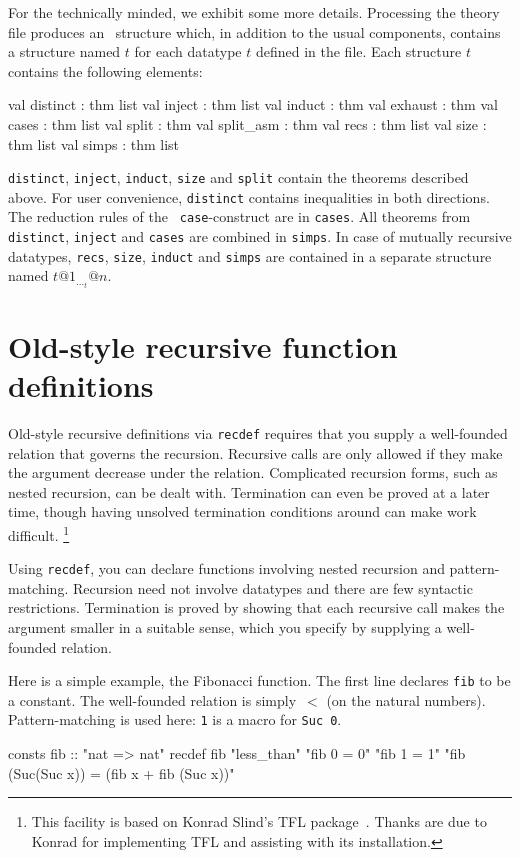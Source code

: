 For the technically minded, we exhibit some more details.  Processing the
theory file produces an \ML\ structure which, in addition to the usual
components, contains a structure named $t$ for each datatype $t$ defined in
the file.  Each structure $t$ contains the following elements:
\begin{ttbox}
val distinct : thm list
val inject : thm list
val induct : thm
val exhaust : thm
val cases : thm list
val split : thm
val split_asm : thm
val recs : thm list
val size : thm list
val simps : thm list
\end{ttbox}
\texttt{distinct}, \texttt{inject}, \texttt{induct}, \texttt{size}
and \texttt{split} contain the theorems
described above.  For user convenience, \texttt{distinct} contains
inequalities in both directions.  The reduction rules of the {\tt
  case}-construct are in \texttt{cases}.  All theorems from {\tt
  distinct}, \texttt{inject} and \texttt{cases} are combined in \texttt{simps}.
In case of mutually recursive datatypes, \texttt{recs}, \texttt{size}, \texttt{induct}
and \texttt{simps} are contained in a separate structure named $t@1_\ldots_t@n$.


\section{Old-style recursive function definitions}\label{sec:HOL:recursive}

Old-style recursive definitions via \texttt{recdef} requires that you
supply a well-founded relation that governs the recursion.  Recursive
calls are only allowed if they make the argument decrease under the
relation.  Complicated recursion forms, such as nested recursion, can
be dealt with.  Termination can even be proved at a later time, though
having unsolved termination conditions around can make work
difficult.%
\footnote{This facility is based on Konrad Slind's TFL
  package~\cite{slind-tfl}.  Thanks are due to Konrad for implementing
  TFL and assisting with its installation.}

Using \texttt{recdef}, you can declare functions involving nested recursion
and pattern-matching.  Recursion need not involve datatypes and there are few
syntactic restrictions.  Termination is proved by showing that each recursive
call makes the argument smaller in a suitable sense, which you specify by
supplying a well-founded relation.

Here is a simple example, the Fibonacci function.  The first line declares
\texttt{fib} to be a constant.  The well-founded relation is simply~$<$ (on
the natural numbers).  Pattern-matching is used here: \texttt{1} is a
macro for \texttt{Suc~0}.
\begin{ttbox}
consts fib  :: "nat => nat"
recdef fib "less_than"
    "fib 0 = 0"
    "fib 1 = 1"
    "fib (Suc(Suc x)) = (fib x + fib (Suc x))"
\end{ttbox}

